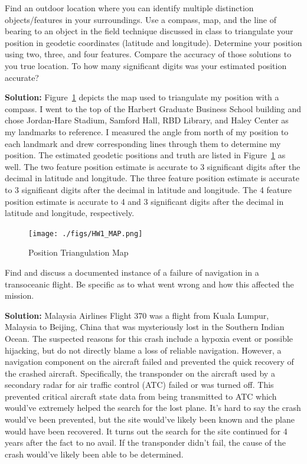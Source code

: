 \documentclass[12pt,letterpaper, onecolumn]{exam}
\renewcommand{\solution}{\noindent\textbf{Solution:}\enspace}
\begin{document}
\begin{questions}
    \clearpage

    \question
    Find an outdoor location where you can identify multiple distinction objects/features
    in your surroundings. Use a compass, map, and the line of bearing to an object in the
    field technique discussed in class to triangulate your position in geodetic coordinates
    (latitude and longitude). Determine your position using two, three, and four features. Compare the
    accuracy of those solutions to you true location. To how many significant digits
    was your estimated position accurate?

    \solution
    Figure~\ref{fig:triPos} depicts the map used to triangulate my position with a compass. I went to the top of the Harbert Graduate Business School building and chose Jordan-Hare Stadium, Samford Hall, RBD Library, and Haley Center as my landmarks to reference. I measured the angle from north of my position to each landmark and drew corresponding lines through them to determine my position. The estimated geodetic positions and truth are listed in Figure~\ref{fig:triPos} as well. The two feature position estimate is accurate to 3 significant digits after the decimal in latitude and longitude. The three feature position estimate is accurate to 3 significant digits after the decimal in latitude and longitude. The 4 feature position estimate is accurate to 4 and 3 significant digits after the decimal in latitude and longitude, respectively.

    \clearpage

    \begin{figure}[!h]
        \centering
        \texttt{[image: ./figs/HW1\_MAP.png]}
        \caption{Position Triangulation Map}
        \label{fig:triPos}
    \end{figure}

    \clearpage

    \question
    Find and discuss a documented instance of a failure of navigation in a transoceanic flight. Be specific as to what went wrong and how this affected the mission.

    \solution
    Malaysia Airlines Flight 370 was a flight from Kuala Lumpur, Malaysia to Beijing, China that was mysteriously lost in the Southern Indian Ocean. The suspected reasons for this crash include a hypoxia event or possible hijacking, but do not directly blame a loss of reliable navigation. However, a navigation component on the aircraft failed and prevented the quick recovery of the crashed aircraft. Specifically, the transponder on the aircraft used by a secondary radar for air traffic control (ATC) failed or was turned off. This prevented critical aircraft state data from being transmitted to ATC which would've extremely helped the search for the lost plane. It's hard to say the crash would've been prevented, but the site would've likely been known and the plane would have been recovered. It turns out the search for the site continued for 4 years after the fact to no avail. If the transponder didn't fail, the cause of the crash would've likely been able to be determined.


\end{questions}
\end{document}
